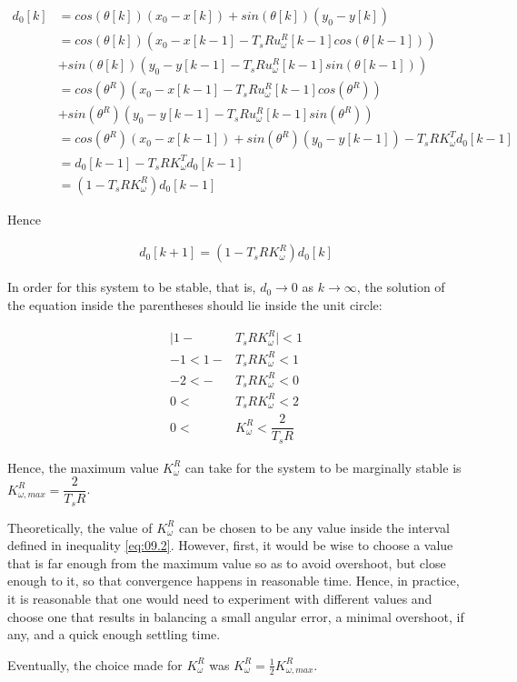 \begin{align*}
  d_0[k] &= cos(\theta[k]) (x_0 - x[k]) + sin(\theta[k]) (y_0 - y[k]) \\
         &= cos(\theta[k]) (x_0 - x[k-1] - T_s R u_{\omega}^R[k-1] cos(\theta[k-1])) \\
         &+ sin(\theta[k]) (y_0 - y[k-1] - T_s R u_{\omega}^R[k-1] sin(\theta[k-1])) \\
         &= cos(\theta^R) (x_0 - x[k-1] - T_s R u_{\omega}^R[k-1] cos(\theta^R)) \\
         &+ sin(\theta^R) (y_0 - y[k-1] - T_s R u_{\omega}^R[k-1] sin(\theta^R)) \\
         &= cos(\theta^R) (x_0 - x[k-1]) + sin(\theta^R) (y_0 - y[k-1]) -T_s R K_{\omega}^T d_0[k-1]  \\
         &= d_0[k-1] - T_s R K_{\omega}^T d_0[k-1]  \\
         &= (1-T_s R K_{\omega}^R)d_0[k-1]
\end{align*}

Hence

\begin{align*}
  d_0[k+1]= (1-T_s R K_{\omega}^R)d_0[k]
\end{align*}

In order for this system to be stable, that is, $d_0 \to 0$ as $k \to \infty$,
the solution of the equation inside the parentheses should lie inside the unit
circle:

\begin{align}
  \Big|1 - &T_s R K_{\omega}^R\Big| < 1 \nonumber \\
  -1 < 1 - &T_s R K_{\omega}^R < 1 \nonumber \\
  -2 < - &T_s R K_{\omega}^R < 0 \nonumber \\
   0 <\ &T_s R K_{\omega}^R < 2 \nonumber \\
   0 <\ &K_{\omega}^R < \dfrac{2}{T_s R} \label{eq:09.2}
\end{align}

Hence, the maximum value $K_{\omega}^R$ can take for the system to be marginally
stable is $K_{\omega,max}^R = \dfrac{2}{T_s R}$.

Theoretically, the value of $K_{\omega}^R$ can be chosen to be any value inside
the interval defined in inequality \ref{eq:09.2}. However, first, it would be
wise to choose a value that is far enough from the maximum value so as to avoid
overshoot, but close enough to it, so that convergence happens in reasonable
time. Hence, in practice, it is reasonable that one would need to experiment
with different values and choose one that results in balancing a small angular
error, a minimal overshoot, if any, and a quick enough settling time.

Eventually, the choice made for $K_{\omega}^R$ was
$K_{\omega}^R = \frac{1}{2} K_{\omega,max}^R$.
